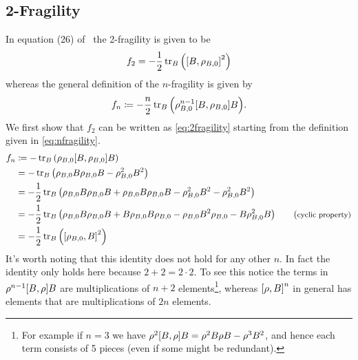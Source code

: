 \documentclass[11pt]{article}
\theoremstyle{definition}
\begin{document}
\subsection{2-Fragility}
In equation (26) of~\cite{dynamic-entropies} the 2-fragility is given to be
\begin{equation}\label{eq:2fragility}
	f_2 = -\frac{1}{2}\tr_B\qty(\comm{B}{\rho_{B, 0}}^2)
\end{equation}
whereas the general definition of the $n$-fragility is given by
\begin{equation}\label{eq:nfragility}
	f_n\coloneqq -\frac{n}{2}\tr_B\qty(\rho_{B, 0}^{n-1}\comm{B}{\rho_{B, 0}}B).
\end{equation}
We first show that $f_2$ can be written as \cref{eq:2fragility} starting from the definition given in \cref{eq:nfragility}.
\begin{align*}
	f_n & \coloneqq -\tr_B\qty(\rho_{B, 0}\comm{B}{\rho_{B, 0}}B)                                                                                                         \\
	    & = -\tr_B\qty(\rho_{B, 0}B\rho_{B, 0}B - \rho_{B, 0}^2B^2)                                                                                                       \\
	    & = -\frac{1}{2}\tr_B\qty(\rho_{B, 0}B\rho_{B, 0}B + \rho_{B, 0}B\rho_{B, 0}B - \rho_{B, 0}^2B^2 - \rho_{B, 0}^2B^2)                                              \\
	    & = -\frac{1}{2}\tr_B\qty(\rho_{B, 0}B\rho_{B, 0}B + B\rho_{B, 0}B\rho_{B, 0} - \rho_{B, 0}B^2\rho_{B, 0} - B\rho_{B, 0}^2B) \tag{\footnotesize{cyclic property}} \\
	    & = -\frac{1}{2}\tr_B\qty(\comm{\rho_{B, 0}}{B}^2)
\end{align*}
It's worth noting that this identity does not hold for any other $n$. In fact the identity only holds here because $2+2 = 2\cdot 2$. To see this notice the terms in $\rho^{n-1}\comm{B}{\rho}B$ are multiplications of $n+2$ elements\footnote{For example if $n = 3$ we have $\rho^{2}\comm{B}{\rho}B = \rho^2B\rho B - \rho^3B^2$, and hence each term consists of 5 pieces (even if some might be redundant).}, whereas $\comm{\rho}{B}^n$ in general has elements that are multiplications of $2n$ elements.
\end{document}
